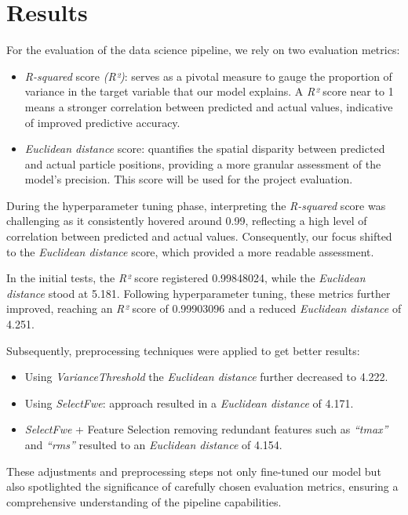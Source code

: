\documentclass[conference]{IEEEtran}
\begin{document}
\section{Results}
For the evaluation of the data science pipeline, we rely on two evaluation metrics:
\begin{itemize}
    \item \textit{R-squared} score \textit{(R²)}: serves as a pivotal measure to gauge the proportion 
    of variance in the target variable that our model explains. A \textit{R²} score near to 1 
    means a stronger correlation between predicted and actual values, indicative of 
    improved predictive accuracy.
    \item \textit{Euclidean distance} score: quantifies the spatial disparity between predicted and 
    actual particle positions, providing a more granular assessment of the model's 
    precision. \cite{OpenAI_ChatGPT_help_me_on_this}
    This score will be used for the project evaluation.\\
\end{itemize}

During the hyperparameter tuning phase, interpreting the \textit{R-squared} score was 
challenging as it consistently hovered around 0.99, reflecting a high level of correlation 
between predicted and actual values. Consequently, our focus shifted to the 
\textit{Euclidean distance} score, which provided a more readable assessment.

In the initial tests, the \textit{R²} score registered 0.99848024, while the \textit{Euclidean 
distance} stood at 5.181. Following hyperparameter tuning, these metrics further improved, 
reaching an \textit{R²} score of 0.99903096 and a reduced \textit{Euclidean distance} of 4.251.

Subsequently, preprocessing techniques were applied to get better results:
\begin{itemize}
    \item Using \textit{VarianceThreshold} the \textit{Euclidean distance} further decreased to 4.222.
    \item Using \textit{SelectFwe}: approach resulted in a \textit{Euclidean distance} of 4.171.
    \item \textit{SelectFwe} + Feature Selection removing redundant features such 
    as \textit{“tmax”} and \textit{“rms”} resulted to an 
    \textit{Euclidean distance} of 4.154.
\end{itemize}

These adjustments and preprocessing steps not only fine-tuned our model but also spotlighted 
the significance of carefully chosen evaluation metrics, ensuring a comprehensive understanding 
of the pipeline capabilities.\\
\end{document}
